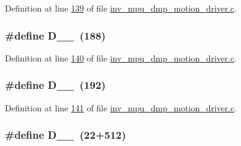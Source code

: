 Definition at line \hyperlink{inv__mpu__dmp__motion__driver_8c_source_l00139}{139} of file \hyperlink{inv__mpu__dmp__motion__driver_8c_source}{inv\+\_\+mpu\+\_\+dmp\+\_\+motion\+\_\+driver.\+c}.

\subsubsection[{\texorpdfstring{D\+\_\+0\+\_\+188}{D_0_188}}]{\setlength{\rightskip}{0pt plus 5cm}\#define D\+\_\+\_~(188)}\hypertarget{group___d_r_i_v_e_r_s_gabe9d05e6c0b53d1452944c767ec4e39f}{}\label{group___d_r_i_v_e_r_s_gabe9d05e6c0b53d1452944c767ec4e39f}


Definition at line \hyperlink{inv__mpu__dmp__motion__driver_8c_source_l00140}{140} of file \hyperlink{inv__mpu__dmp__motion__driver_8c_source}{inv\+\_\+mpu\+\_\+dmp\+\_\+motion\+\_\+driver.\+c}.

\subsubsection[{\texorpdfstring{D\+\_\+0\+\_\+192}{D_0_192}}]{\setlength{\rightskip}{0pt plus 5cm}\#define D\+\_\+\_~(192)}\hypertarget{group___d_r_i_v_e_r_s_ga737381384143cf039503023e04037a26}{}\label{group___d_r_i_v_e_r_s_ga737381384143cf039503023e04037a26}


Definition at line \hyperlink{inv__mpu__dmp__motion__driver_8c_source_l00141}{141} of file \hyperlink{inv__mpu__dmp__motion__driver_8c_source}{inv\+\_\+mpu\+\_\+dmp\+\_\+motion\+\_\+driver.\+c}.

\subsubsection[{\texorpdfstring{D\+\_\+0\+\_\+22}{D_0_22}}]{\setlength{\rightskip}{0pt plus 5cm}\#define D\+\_\+\_~(22+512)}\hypertarget{group___d_r_i_v_e_r_s_ga155b1481095edac7a26c8c3d5b9c5a24}{}\label{group___d_r_i_v_e_r_s_ga155b1481095edac7a26c8c3d5b9c5a24}


